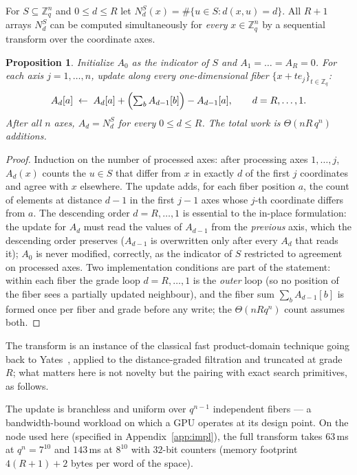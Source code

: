 \documentclass[11pt]{amsart}
\newtheorem{proposition}[theorem]{Proposition}
\newcommand{\Zq}{\mathbb{Z}_q}
\begin{document}
For $S\subseteq\Zq^n$ and $0\le d\le R$ let
$N_d^S(x)=\#\{u\in S: d(x,u)=d\}$. All $R+1$ arrays $N_d^S$ can be
computed simultaneously for \emph{every} $x\in\Zq^n$ by a sequential
transform over the coordinate axes.

\begin{proposition}\label{prop:dct}
Initialize $A_0$ as the indicator of $S$ and $A_1=\dots=A_R=0$. For each
axis $j=1,\dots,n$, update along every one-dimensional fiber
$\{x+t e_j\}_{t\in\mathbb{Z}_q}$:
\[
A_d[a] \;\leftarrow\; A_d[a] + \Bigl(\textstyle\sum_b A_{d-1}[b]\Bigr) -
A_{d-1}[a],
\qquad d=R,\dots,1 .
\]
After all $n$ axes, $A_d = N_d^S$ for every $0\le d\le R$. The total work
is $\Theta\!\left(n R\, q^n\right)$ additions.
\end{proposition}

\begin{proof}
Induction on the number of processed axes: after processing axes
$1,\dots,j$, $A_d(x)$ counts the $u\in S$ that differ from $x$ in exactly
$d$ of the first $j$ coordinates and agree with $x$ elsewhere. The update
adds, for each fiber position $a$, the count of elements at distance $d-1$
in the first $j-1$ axes whose $j$-th coordinate differs from $a$. The
descending order $d=R,\dots,1$ is essential to the in-place formulation:
the update for $A_d$ must read the values of $A_{d-1}$ from the
\emph{previous} axis, which the descending order preserves ($A_{d-1}$ is
overwritten only after every $A_d$ that reads it); $A_0$ is never
modified, correctly, as the indicator of $S$ restricted to agreement on
processed axes. Two implementation conditions are part of the statement:
within each fiber the grade loop $d=R,\dots,1$ is the \emph{outer} loop
(so no position of the fiber sees a partially updated neighbour), and the
fiber sum $\sum_b A_{d-1}[b]$ is formed once per fiber and grade before
any write; the $\Theta(nRq^n)$ count assumes both.
\end{proof}

The transform is an instance of the classical fast product-domain
technique going back to Yates~\cite{Yates}, applied to the
distance-graded filtration and truncated at grade $R$; what matters here
is not novelty but the pairing with exact search primitives, as follows.

The update is branchless and uniform over $q^{n-1}$ independent fibers ---
a bandwidth-bound workload on which a GPU operates at its design point. On
the node used here (specified in Appendix~\ref{app:impl}), the full
transform takes $63$\,ms at
$q^n=7^{10}$ and $143$\,ms at $8^{10}$ with $32$-bit counters (memory
footprint $4(R+1)+2$ bytes per word of the space).
\end{document}

